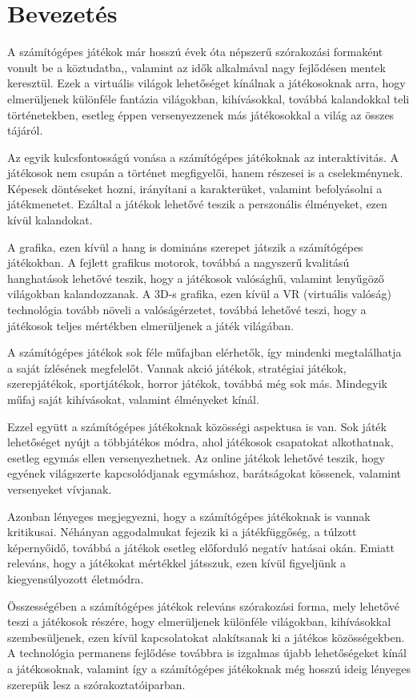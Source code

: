 \chapter{Bevezetés}

A számítógépes játékok már hosszú évek óta népszerű szórakozási formaként vonult be a köztudatba,, valamint az idők alkalmával nagy fejlődésen mentek keresztül. Ezek a virtuális világok lehetőséget kínálnak a játékosoknak arra, hogy elmerüljenek különféle fantázia világokban, kihívásokkal, továbbá kalandokkal teli történetekben, esetleg éppen versenyezzenek más játékosokkal a világ az összes tájáról.

Az egyik kulcsfontosságú vonása a számítógépes játékoknak az interaktivitás. A játékosok nem csupán a történet megfigyelői, hanem részesei is a cselekménynek. Képesek döntéseket hozni, irányítani a karakterüket, valamint befolyásolni a játékmenetet. Ezáltal a játékok lehetővé teszik a perszonális élményeket, ezen kívül kalandokat.

A grafika, ezen kívül a hang is domináns szerepet játszik a számítógépes játékokban. A fejlett grafikus motorok, továbbá a nagyszerű kvalitású hanghatások lehetővé teszik, hogy a játékosok valósághű, valamint lenyűgöző világokban kalandozzanak. A 3D-s grafika, ezen kívül a VR (virtuális valóság) technológia tovább növeli a valóságérzetet, továbbá lehetővé teszi, hogy a játékosok teljes mértékben elmerüljenek a játék világában.

A számítógépes játékok sok féle műfajban elérhetők, így mindenki megtalálhatja a saját ízlésének megfelelőt. Vannak akció játékok, stratégiai játékok, szerepjátékok, sportjátékok, horror játékok, továbbá még sok más. Mindegyik műfaj saját kihívásokat, valamint élményeket kínál.

Ezzel együtt a számítógépes játékoknak közösségi aspektusa is van. Sok játék lehetőséget nyújt a többjátékos módra, ahol játékosok csapatokat alkothatnak, esetleg egymás ellen versenyezhetnek. Az online játékok lehetővé teszik, hogy egyének világszerte kapcsolódjanak egymáshoz, barátságokat kössenek, valamint versenyeket vívjanak.

Azonban lényeges megjegyezni, hogy a számítógépes játékoknak is vannak kritikusai. Néhányan aggodalmukat fejezik ki a játékfüggőség, a túlzott képernyőidő, továbbá a játékok esetleg előforduló negatív hatásai okán. Emiatt releváns, hogy a játékokat mértékkel játsszuk, ezen kívül figyeljünk a kiegyensúlyozott életmódra.

Összességében a számítógépes játékok releváns szórakozási forma, mely lehetővé teszi a játékosok részére, hogy elmerüljenek különféle világokban, kihívásokkal szembesüljenek, ezen kívül kapcsolatokat alakítsanak ki a játékos közösségekben. A technológia permanens fejlődése továbbra is izgalmas újabb lehetőségeket kínál a játékosoknak, valamint így a számítógépes játékoknak még hosszú ideig lényeges szerepük lesz a szórakoztatóiparban.

